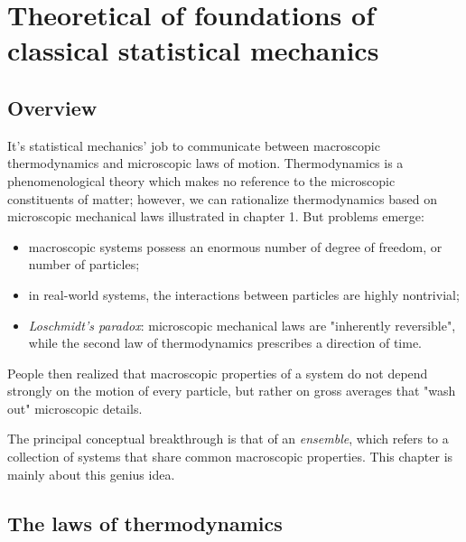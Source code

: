 
\chapter{Theoretical of foundations of classical statistical mechanics}

\section{Overview}

It's statistical mechanics' job to communicate between macroscopic thermodynamics and microscopic laws of motion. Thermodynamics is a phenomenological theory which makes no reference to the microscopic constituents of matter; however, we can rationalize thermodynamics based on microscopic mechanical laws illustrated in chapter 1. But problems emerge:
\begin{itemize}
	\item macroscopic systems possess an enormous number of degree of freedom, or number of particles;
	\item in real-world systems, the interactions between particles are highly nontrivial;
	\item \textit{Loschmidt's paradox}: microscopic mechanical laws are "inherently reversible", while the second law of thermodynamics prescribes a direction of time.
\end{itemize}

People then realized that macroscopic properties of a system do not depend strongly on the motion of every particle, but rather on gross averages that "wash out" microscopic details. 

The principal conceptual breakthrough is that of an \textit{ensemble}, which refers to a collection of systems that share common macroscopic properties. This chapter is mainly about this genius idea.

\section{The laws of thermodynamics}

